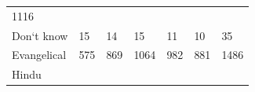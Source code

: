 \documentclass[12pt,oneside]{reedthesis}
\theoremstyle{definition}
\theoremstyle{definition}
\theoremstyle{definition}
\theoremstyle{remark}
\begin{document}
\begin{longtable}[]{@{}lllllll@{}}
\begin{minipage}[t]{0.11\columnwidth}
1116\strut
\end{minipage}\tabularnewline
\begin{minipage}[t]{0.16\columnwidth}\raggedright\strut
Don`t know\strut
\end{minipage} & \begin{minipage}[t]{0.09\columnwidth}\raggedright\strut
15\strut
\end{minipage} & \begin{minipage}[t]{0.11\columnwidth}\raggedright\strut
14\strut
\end{minipage} & \begin{minipage}[t]{0.11\columnwidth}\raggedright\strut
15\strut
\end{minipage} & \begin{minipage}[t]{0.11\columnwidth}\raggedright\strut
11\strut
\end{minipage} & \begin{minipage}[t]{0.11\columnwidth}\raggedright\strut
10\strut
\end{minipage} & \begin{minipage}[t]{0.11\columnwidth}\raggedright\strut
35\strut
\end{minipage}\tabularnewline
\begin{minipage}[t]{0.16\columnwidth}\raggedright\strut
Evangelical\strut
\end{minipage} & \begin{minipage}[t]{0.09\columnwidth}\raggedright\strut
575\strut
\end{minipage} & \begin{minipage}[t]{0.11\columnwidth}\raggedright\strut
869\strut
\end{minipage} & \begin{minipage}[t]{0.11\columnwidth}\raggedright\strut
1064\strut
\end{minipage} & \begin{minipage}[t]{0.11\columnwidth}\raggedright\strut
982\strut
\end{minipage} & \begin{minipage}[t]{0.11\columnwidth}\raggedright\strut
881\strut
\end{minipage} & \begin{minipage}[t]{0.11\columnwidth}\raggedright\strut
1486\strut
\end{minipage}\tabularnewline
\begin{minipage}[t]{0.16\columnwidth}\raggedright\strut
Hindu\strut
\end{minipage} & \begin{minipage}[t]{0.09\columnwidth}\raggedright\strut

\end{minipage}
\end{longtable}
\end{document}
